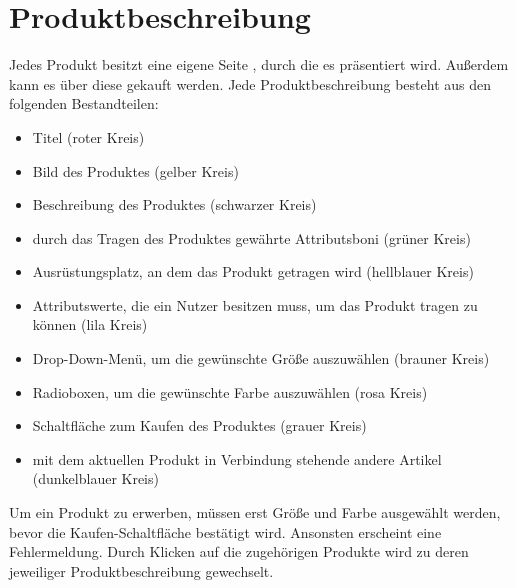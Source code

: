 \section{Produktbeschreibung}
\label{chp:Produktbeschreibung}
Jedes Produkt besitzt eine eigene Seite , durch die es präsentiert wird. Außerdem kann es über diese gekauft werden. Jede Produktbeschreibung besteht aus den folgenden Bestandteilen:
\begin{itemize}
  \item Titel (roter Kreis)
  \vspace*{-0.5em}
  \item Bild des Produktes (gelber Kreis)
  \vspace*{-0.5em}
  \item Beschreibung des Produktes (schwarzer Kreis)
  \vspace*{-0.5em}
  \item durch das Tragen des Produktes gewährte Attributsboni  (grüner Kreis)
  \vspace*{-0.5em}
  \item Ausrüstungsplatz, an dem das Produkt getragen wird (hellblauer Kreis)
  \vspace*{-0.5em}
  \item Attributswerte, die ein Nutzer besitzen muss, um das Produkt tragen zu können (lila Kreis)
  \vspace*{-0.5em}
  \item Drop-Down-Menü, um die gewünschte Größe auszuwählen (brauner Kreis)
  \vspace*{-0.5em}
  \item Radioboxen, um die gewünschte Farbe auszuwählen (rosa Kreis)
  \vspace*{-0.5em}
  \item Schaltfläche zum Kaufen des Produktes (grauer Kreis)
  \vspace*{-0.5em}
  \item mit dem aktuellen Produkt in Verbindung stehende andere Artikel (dunkel\-blau\-er Kreis)
\end{itemize}
Um ein Produkt zu erwerben, müssen erst Größe und Farbe ausgewählt werden, bevor die Kaufen-Schaltfläche bestätigt wird. Ansonsten erscheint eine Fehlermeldung. Durch Klicken auf die zugehörigen Produkte wird zu deren jeweiliger Produktbeschreibung gewechselt.


